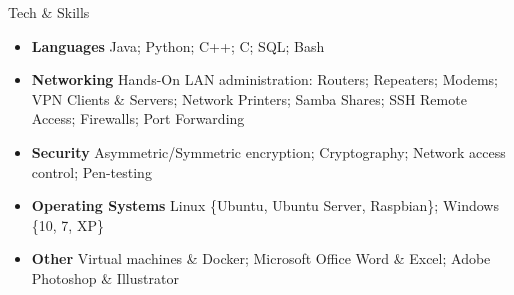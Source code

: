 \documentclass[]{mcdowellcv}
\begin{document}
	\begin{cvsection}{Tech \& Skills}
		\begin{cvsubsection}{}{}
			\begin{itemize}[itemsep=6pt]
				\item \textbf{Languages} Java; Python; C++; C; SQL; Bash 
				\item \textbf{Networking} Hands-On LAN administration: Routers; Repeaters; Modems; VPN Clients \& Servers; Network Printers; Samba Shares; SSH Remote Access; Firewalls; Port Forwarding 
				\item \textbf{Security} Asymmetric/Symmetric encryption; Cryptography; Network access control; Pen-testing
				\item \textbf{Operating Systems} Linux \{Ubuntu, Ubuntu Server, Raspbian\}; Windows \{10, 7, XP\}
				\item \textbf{Other} Virtual machines \& Docker; Microsoft Office Word \& Excel; Adobe Photoshop \& Illustrator
			\end{itemize}
		\end{cvsubsection}
	\end{cvsection}
	
\end{document}
